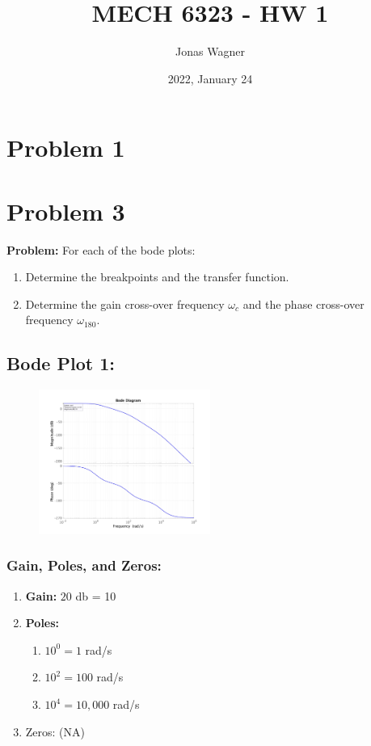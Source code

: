 \documentclass[letter]{article}
\title{MECH 6323 - HW 1}
\author{Jonas Wagner}
\date{2022, January 24}
\numberwithin{equation}{section}
\begin{document}
	

\maketitle


\section{Problem 1}









\newpage
\section{Problem 3}
\textbf{Problem:}
For each of the bode plots:
\begin{enumerate}
	\item Determine the breakpoints and the transfer function.
	\item Determine the gain cross-over frequency $\omega_c$ and the phase cross-over frequency $\omega_{180}$.
\end{enumerate}

\subsection{Bode Plot 1:}
\begin{figure}[h]
	\centering
	\includegraphics[width=0.5\textwidth]{figs/pblm3a.jpg}
\end{figure}

\subsubsection{Gain, Poles, and Zeros:}
\begin{enumerate}
	\item \textbf{Gain:}  $20$ db = 10
	\item \textbf{Poles:}
	\begin{enumerate}
		\item $10^{0} = 1$ rad/s
		\item $10^{2} = 100$ rad/s
		\item $10^{4} = 10,000$ rad/s
	\end{enumerate}
	\item Zeros: (NA)
\end{enumerate}
\end{document}

